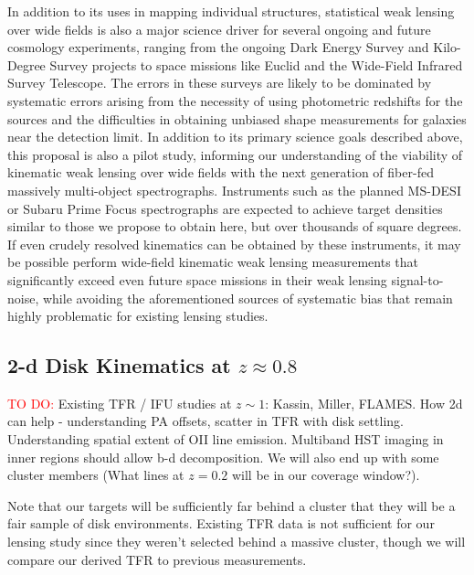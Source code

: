 \documentclass[12pt]{article}
\begin{document}
In addition to its uses in mapping individual structures, statistical weak lensing over wide fields is also a major science driver for several ongoing and future cosmology experiments, ranging from the ongoing Dark Energy Survey and Kilo-Degree Survey projects to space missions like Euclid and the Wide-Field Infrared Survey Telescope. The errors in these surveys are likely to be dominated by systematic errors arising from the necessity of using photometric redshifts for the sources and the difficulties in obtaining unbiased shape measurements for galaxies near the detection limit. In addition to its primary science goals described above, this proposal is also a pilot study, informing our understanding of the viability of kinematic weak lensing over wide fields with the next generation of fiber-fed massively multi-object spectrographs. Instruments such as the planned MS-DESI or Subaru Prime Focus spectrographs are expected to achieve target densities similar to those we propose to obtain here, but over thousands of square degrees. If even crudely resolved kinematics can be obtained by these instruments, it may be possible perform wide-field kinematic weak lensing measurements that significantly exceed even future space missions in their weak lensing signal-to-noise, while avoiding the aforementioned sources of systematic bias that remain highly problematic for existing lensing studies.

\subsection{2-d Disk Kinematics at $z\approx0.8$}

\textcolor{Red}{TO DO:} 
Existing TFR / IFU studies at $z\sim1$: Kassin, Miller, FLAMES. How 2d can help - understanding PA offsets, scatter in TFR with disk settling. Understanding spatial extent of OII line emission. Multiband HST imaging in inner regions should allow b-d decomposition. We will also end up with some cluster members (What lines at $z=0.2$ will be in our coverage window?).

Note that our targets will be sufficiently far behind a cluster that they will be a fair sample of disk environments. Existing TFR data is not sufficient for our lensing study since they weren't selected behind a massive cluster, though we will compare our derived TFR to previous measurements.
\end{document}
